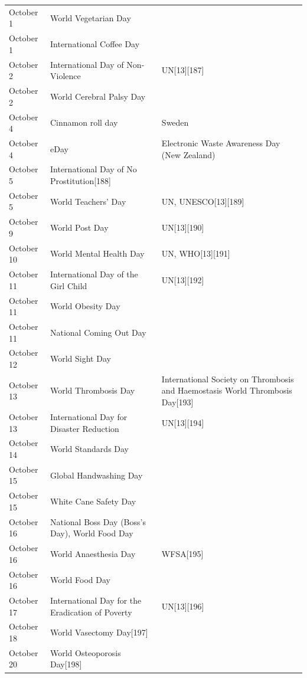 \documentclass[
  openany]{book}
\begin{document}
\begin{longtable}[t]{>{\raggedright\arraybackslash}p{8em}>{\raggedright\arraybackslash}p{20em}>{\raggedright\arraybackslash}p{12em}}
\rowcolor{gray!6}  October 1 & World Vegetarian Day & \\
October 1 & International Coffee Day & \\
\addlinespace
\rowcolor{gray!6}  October 2 & International Day of Non-Violence & UN[13][187]\\
October 2 & World Cerebral Palsy Day & \\
\rowcolor{gray!6}  October 4 & Cinnamon roll day & Sweden\\
October 4 & eDay & Electronic Waste Awareness Day (New Zealand)\\
\rowcolor{gray!6}  October 5 & International Day of No Prostitution[188] & \\
\addlinespace
October 5 & World Teachers' Day & UN, UNESCO[13][189]\\
\rowcolor{gray!6}  October 9 & World Post Day & UN[13][190]\\
October 10 & World Mental Health Day & UN, WHO[13][191]\\
\rowcolor{gray!6}  October 11 & International Day of the Girl Child & UN[13][192]\\
October 11 & World Obesity Day & \\
\addlinespace
\rowcolor{gray!6}  October 11 & National Coming Out Day & \\
October 12 & World Sight Day & \\
\rowcolor{gray!6}  October 13 & World Thrombosis Day & International Society on Thrombosis and Haemostasis World Thrombosis Day[193]\\
October 13 & International Day for Disaster Reduction & UN[13][194]\\
\rowcolor{gray!6}  October 14 & World Standards Day & \\
\addlinespace
October 15 & Global Handwashing Day & \\
\rowcolor{gray!6}  October 15 & White Cane Safety Day & \\
October 16 & National Boss Day (Boss's Day), World Food Day & \\
\rowcolor{gray!6}  October 16 & World Anaesthesia Day & WFSA[195]\\
October 16 & World Food Day & \\
\addlinespace
\rowcolor{gray!6}  October 17 & International Day for the Eradication of Poverty & UN[13][196]\\
October 18 & World Vasectomy Day[197] & \\
\rowcolor{gray!6}  October 20 & World Osteoporosis Day[198] & \\

\end{longtable}
\end{document}
